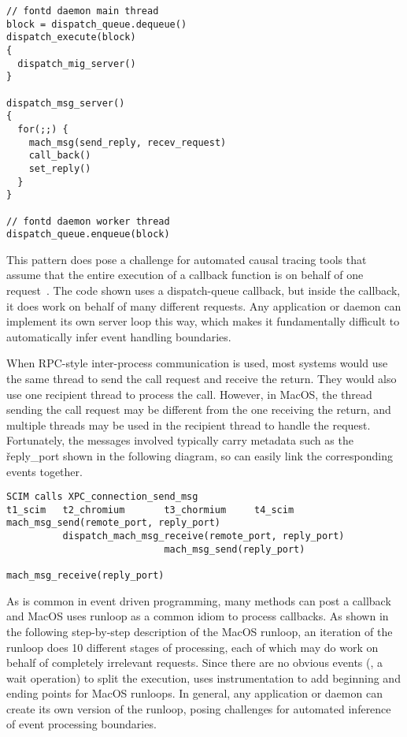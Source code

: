 {\footnotesize \begin{verbatim}
// fontd daemon main thread
block = dispatch_queue.dequeue()
dispatch_execute(block)
{
  dispatch_mig_server()
}

dispatch_msg_server()
{
  for(;;) {
    mach_msg(send_reply, recev_request)
    call_back()
    set_reply()
  }
}

// fontd daemon worker thread
dispatch_queue.enqueue(block)
\end{verbatim}
}

This pattern does pose a challenge for automated causal tracing tools that
assume that the entire execution of a callback function is on behalf of
one request~\cite{xxx}.  The code shown uses a dispatch-queue callback,
but inside the callback, it does work on behalf of many different
requests.  Any application or daemon can implement its  own server loop
this way, which makes it fundamentally difficult to automatically infer
event handling boundaries.

When RPC-style inter-process communication is used, most systems would use
the same thread to send the call request and receive the return.  They
would also use one recipient thread to process the call.  However, in
MacOS, the thread sending the call request may be different from the one
receiving the return, and multiple threads may be used in the recipient
thread to handle the request.  Fortunately, the messages involved
typically carry metadata such as the \v{reply\_port} shown in the
following diagram, so \xxx can easily link the corresponding events
together.

{\footnotesize \begin{verbatim}
SCIM calls XPC_connection_send_msg
t1_scim   t2_chromium       t3_chormium     t4_scim
mach_msg_send(remote_port, reply_port)
          dispatch_mach_msg_receive(remote_port, reply_port)
                            mach_msg_send(reply_port)
                                             mach_msg_receive(reply_port)
\end{verbatim}
}

As is common in event driven programming, many methods can post a callback
and MacOS uses runloop as a common idiom to process callbacks.  As shown
in the following step-by-step description of the MacOS runloop, an
iteration of the runloop does 10 different stages of processing, each of
which may do work on behalf of completely irrelevant requests.  Since
there are no obvious events (\eg, a wait operation) to split the
execution, \xxx uses instrumentation to add beginning and ending points
for MacOS runloops.  In general, any application or daemon can create
its own version of the runloop, posing challenges for automated
inference of event processing boundaries.

